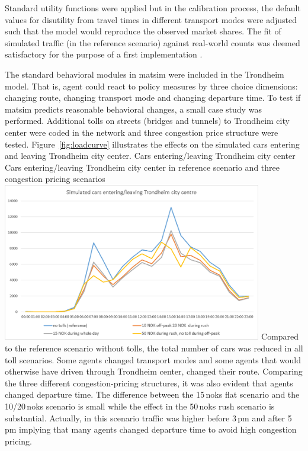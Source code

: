 Standard utility functions were applied but in the calibration process, the default values for disutility from travel times in different transport modes were adjusted such that the model would reproduce the observed market shares. The fit of simulated traffic (in the reference scenario) against real-world counts was deemed satisfactory for the purpose of a first implementation \citep[][]{Bockemuehl_TechRep_UH_2014}. 

The standard behavioral modules in \gls{matsim} were included in the Trondheim model. That is, agent could react to policy measures by three choice dimensions: changing route, changing transport mode and changing departure time. To test if \gls{matsim} predicts reasonable behavioral changes, a small case study was performed. Additional tolls on streets (bridges and tunnels) to Trondheim city center were coded in the network and three congestion price structure were tested. Figure~\ref{fig:loadcurve} illustrates the effects on the simulated cars entering and leaving Trondheim city center. 
%
\createfigure%
{Cars entering/leaving Trondheim city center}%
{Cars entering/leaving Trondheim city center in reference scenario and three congestion pricing scenarios \citep[source][]{Bockemuehl_TechRep_UH_2014}}%
{\label{fig:loadcurve}}%
{\includegraphics[width=0.85\textwidth, angle=0]{./using/figures/trondheimloadcurve.png}}%
{}
%
Compared to the reference scenario without tolls, the total number of cars was reduced in all toll scenarios. Some agents changed transport modes and some agents that would otherwise have driven through Trondheim center, changed their route. Comparing the three different congestion-pricing structures, it was also evident that agents changed departure time. The difference between the 15\,\glspl{nok} flat scenario and the 10/20\,\glspl{nok} scenario is small while the effect in the 50\,\glspl{nok} rush scenario is substantial. Actually, in this scenario traffic was higher before 3\,pm and after 5\,pm implying that many agents changed departure time to avoid high congestion pricing.  











